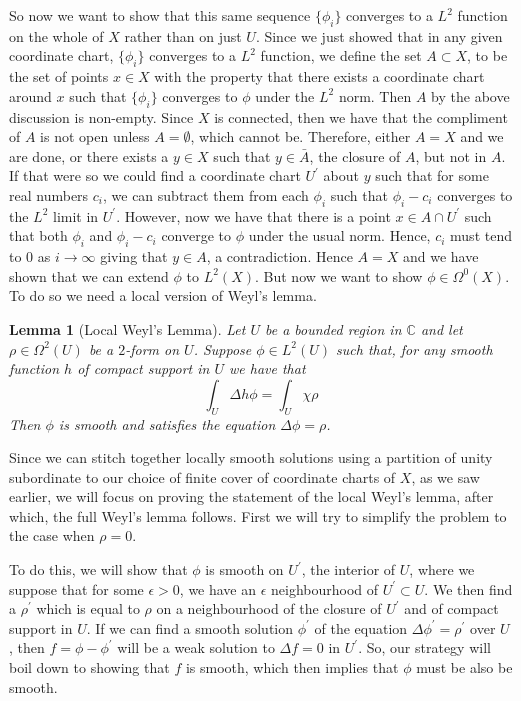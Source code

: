 \documentclass[11pt]{report}
\newtheorem{lemma}[thm]{Lemma}
\theoremstyle{definition}
\begin{document}
So now we want to show that this same sequence $\{\phi_i\}$ converges to a $L^2$ function on the whole of $X$ rather than on just $U$. Since we just showed that in any given coordinate chart, $\{\phi_i\}$ converges to a $L^2$ function, we define the set $A \subset X$, to be the set of points $x \in X$ with the property that there exists a coordinate chart around $x$ such that $\{\phi_i\}$ converges to $\phi$ under the $L^2$ norm. Then $A$ by the above discussion is non-empty. Since $X$ is connected, then we have that the compliment of $A$ is not open unless $A=\emptyset$, which cannot be. Therefore, either $A=X$ and we are done, or there exists a $y \in X$ such that $y \in \bar{A}$, the closure of $A$, but not in $A$. If that were so we could find a coordinate chart $U^{\prime}$ about $y$ such that for some real numbers $c_i$, we can subtract them from each $\phi_i$ such that $\phi_i - c_i$ converges to the $L^2$ limit in $U^{\prime}$. However, now we have that there is a point $x \in A \cap U^{\prime}$ such that both $\phi_i$ and $\phi_i - c_i$ converge to $\phi$ under the usual norm. Hence, $c_i$ must tend to $0$ as $i \rightarrow \infty$ giving that $y \in A$, a contradiction. Hence $A=X$ and we have shown that we can extend $\phi$ to $L^2(X)$. But now we want to show $\phi \in \Omega^0(X)$. To do so we need a local version of Weyl's lemma.
\begin{lemma}[Local Weyl's Lemma]\label{WeylsLemmaLocal}
  Let $U$ be a bounded region in $\mathbb{C}$ and let $\rho \in \Omega^2(U)$ be a $2$-form on $U$. Suppose $\phi \in L^2(U)$ such that, for any smooth function $h$ of compact support in $U$ we have that 
  \[\int_U \Delta h\phi = \int_U \chi\rho\]
  Then $\phi$ is smooth and satisfies the equation $\Delta \phi = \rho$.
\end{lemma}

Since we can stitch together locally smooth solutions using a partition of unity subordinate to our choice of finite cover of coordinate charts of $X$, as we saw earlier, we will focus on proving the statement of the local Weyl's lemma, after which, the full Weyl's lemma follows. First we will try to simplify the problem to the case when $\rho = 0$. 

To do this, we will show that $\phi$ is smooth on $U^{\prime}$, the interior of $U$, where we suppose that for some $\epsilon > 0$, we have an $\epsilon$ neighbourhood of $U^{\prime}\subset U$. We then find a $\rho^{\prime}$ which is equal to $\rho$ on a neighbourhood of the closure of $U^{\prime}$ and of compact support in $U$. If we can find a smooth solution $\phi^{\prime}$ of the equation $\Delta \phi^{\prime} = \rho^{\prime}$ over $U$, then $f = \phi - \phi^{\prime}$ will be a weak solution to $\Delta f = 0 $ in $U^{\prime}$. So, our strategy will boil down to showing that $f$ is smooth, which then implies that $\phi$ must be also be smooth.
\end{document}
